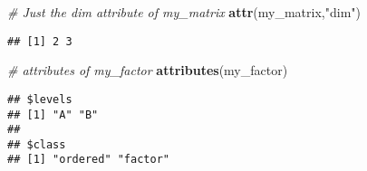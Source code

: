 \documentclass[]{article}
\newenvironment{Shaded}{\begin{snugshade}}{\end{snugshade}}
\newcommand{\KeywordTok}[1]{\textcolor[rgb]{0.13,0.29,0.53}{\textbf{#1}}}
\newcommand{\StringTok}[1]{\textcolor[rgb]{0.31,0.60,0.02}{#1}}
\newcommand{\CommentTok}[1]{\textcolor[rgb]{0.56,0.35,0.01}{\textit{#1}}}
\newcommand{\NormalTok}[1]{#1}
\begin{document}
\begin{Shaded}
\begin{Highlighting}[]
\CommentTok{# Just the dim attribute of my_matrix}
\KeywordTok{attr}\NormalTok{(my_matrix,}\StringTok{"dim"}\NormalTok{)}
\end{Highlighting}
\end{Shaded}

\begin{verbatim}
## [1] 2 3
\end{verbatim}

\begin{Shaded}
\begin{Highlighting}[]
\CommentTok{# attributes of my_factor}
\KeywordTok{attributes}\NormalTok{(my_factor)}
\end{Highlighting}
\end{Shaded}

\begin{verbatim}
## $levels
## [1] "A" "B"
## 
## $class
## [1] "ordered" "factor"
\end{verbatim}
\end{document}
